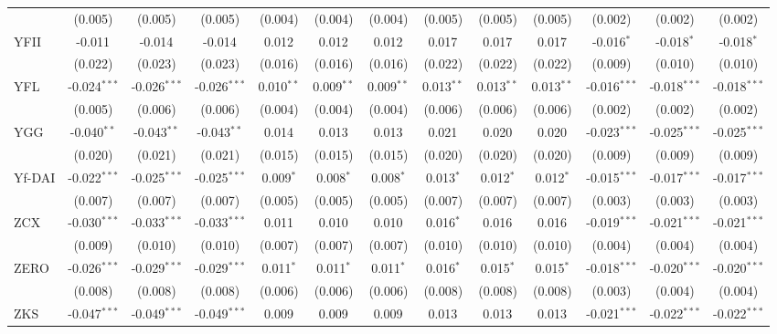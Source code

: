 \begin{table}[!htbp]
\begin{tabular}{@{\extracolsep{5pt}}lcccccccccccc}
  & (0.005) & (0.005) & (0.005) & (0.004) & (0.004) & (0.004) & (0.005) & (0.005) & (0.005) & (0.002) & (0.002) & (0.002) \\
 YFII & -0.011$^{}$ & -0.014$^{}$ & -0.014$^{}$ & 0.012$^{}$ & 0.012$^{}$ & 0.012$^{}$ & 0.017$^{}$ & 0.017$^{}$ & 0.017$^{}$ & -0.016$^{*}$ & -0.018$^{*}$ & -0.018$^{*}$ \\
  & (0.022) & (0.023) & (0.023) & (0.016) & (0.016) & (0.016) & (0.022) & (0.022) & (0.022) & (0.009) & (0.010) & (0.010) \\
 YFL & -0.024$^{***}$ & -0.026$^{***}$ & -0.026$^{***}$ & 0.010$^{**}$ & 0.009$^{**}$ & 0.009$^{**}$ & 0.013$^{**}$ & 0.013$^{**}$ & 0.013$^{**}$ & -0.016$^{***}$ & -0.018$^{***}$ & -0.018$^{***}$ \\
  & (0.005) & (0.006) & (0.006) & (0.004) & (0.004) & (0.004) & (0.006) & (0.006) & (0.006) & (0.002) & (0.002) & (0.002) \\
 YGG & -0.040$^{**}$ & -0.043$^{**}$ & -0.043$^{**}$ & 0.014$^{}$ & 0.013$^{}$ & 0.013$^{}$ & 0.021$^{}$ & 0.020$^{}$ & 0.020$^{}$ & -0.023$^{***}$ & -0.025$^{***}$ & -0.025$^{***}$ \\
  & (0.020) & (0.021) & (0.021) & (0.015) & (0.015) & (0.015) & (0.020) & (0.020) & (0.020) & (0.009) & (0.009) & (0.009) \\
 Yf-DAI & -0.022$^{***}$ & -0.025$^{***}$ & -0.025$^{***}$ & 0.009$^{*}$ & 0.008$^{*}$ & 0.008$^{*}$ & 0.013$^{*}$ & 0.012$^{*}$ & 0.012$^{*}$ & -0.015$^{***}$ & -0.017$^{***}$ & -0.017$^{***}$ \\
  & (0.007) & (0.007) & (0.007) & (0.005) & (0.005) & (0.005) & (0.007) & (0.007) & (0.007) & (0.003) & (0.003) & (0.003) \\
 ZCX & -0.030$^{***}$ & -0.033$^{***}$ & -0.033$^{***}$ & 0.011$^{}$ & 0.010$^{}$ & 0.010$^{}$ & 0.016$^{*}$ & 0.016$^{}$ & 0.016$^{}$ & -0.019$^{***}$ & -0.021$^{***}$ & -0.021$^{***}$ \\
  & (0.009) & (0.010) & (0.010) & (0.007) & (0.007) & (0.007) & (0.010) & (0.010) & (0.010) & (0.004) & (0.004) & (0.004) \\
 ZERO & -0.026$^{***}$ & -0.029$^{***}$ & -0.029$^{***}$ & 0.011$^{*}$ & 0.011$^{*}$ & 0.011$^{*}$ & 0.016$^{*}$ & 0.015$^{*}$ & 0.015$^{*}$ & -0.018$^{***}$ & -0.020$^{***}$ & -0.020$^{***}$ \\
  & (0.008) & (0.008) & (0.008) & (0.006) & (0.006) & (0.006) & (0.008) & (0.008) & (0.008) & (0.003) & (0.004) & (0.004) \\
 ZKS & -0.047$^{***}$ & -0.049$^{***}$ & -0.049$^{***}$ & 0.009$^{}$ & 0.009$^{}$ & 0.009$^{}$ & 0.013$^{}$ & 0.013$^{}$ & 0.013$^{}$ & -0.021$^{***}$ & -0.022$^{***}$ & -0.022$^{***}$ \\

\end{tabular}
\end{table}
